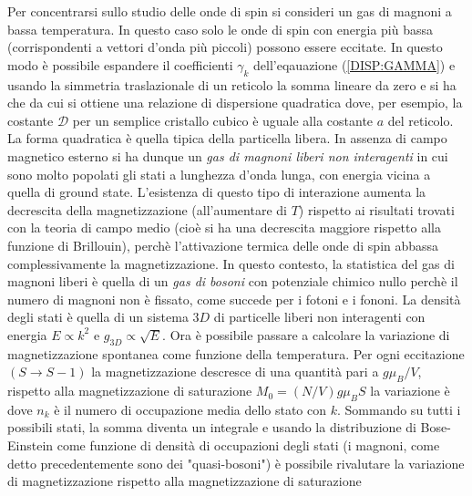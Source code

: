 Per concentrarsi sullo studio delle onde di spin si consideri un gas di magnoni a bassa temperatura. In questo caso solo le onde di spin con energia pi\`u bassa (corrispondenti a vettori d'onda pi\`u piccoli) possono essere eccitate. In questo modo \`e possibile espandere il coefficienti $\gamma_k$ dell'eqauazione (\ref{DISP:GAMMA}) e usando la simmetria traslazionale di un reticolo la somma lineare da zero e si ha che
da cui si ottiene una relazione di dispersione quadratica
dove, per esempio, la costante $\mathcal{D}$ per un semplice cristallo cubico \`e uguale alla costante $a$ del reticolo. La forma quadratica \`e quella tipica della particella libera. In assenza di campo magnetico esterno si ha dunque un \textit{gas di magnoni liberi non interagenti} in cui sono molto popolati gli stati a lunghezza d'onda lunga, con energia vicina a quella di ground state. L'esistenza di questo tipo di interazione aumenta la decrescita della magnetizzazione (all'aumentare di $T$) rispetto ai risultati trovati con la teoria di campo medio (cio\`e si ha una decrescita maggiore rispetto alla funzione di Brillouin), perch\`e l'attivazione termica delle onde di spin abbassa complessivamente la magnetizzazione. 
In questo contesto, la statistica del gas di magnoni liberi \`e quella di un \textit{gas di bosoni} con potenziale chimico nullo perch\`e il numero di magnoni non \`e fissato, come succede per i fotoni e i fononi. La densit\`a degli stati \`e quella di un sistema $3D$ di particelle liberi non interagenti con energia $E\propto k^2$ e $g_{3D} \propto \sqrt{E}$. Ora \`e possibile passare a calcolare la variazione di magnetizzazione spontanea come funzione della temperatura. Per ogni eccitazione $(S\to S-1)$ la magnetizzazione descresce di una quantit\`a pari a $g\mu_B/V$, rispetto alla magnetizzazione di saturazione $M_0= (N/V)g\mu_B S$ la variazione \`e 
dove $n_k$ \`e il numero di occupazione media dello stato con $k$. Sommando su tutti i possibili stati, la somma diventa un integrale e usando la distribuzione di Bose-Einstein come funzione di densit\`a di occupazioni degli stati (i magnoni, come detto precedentemente sono dei "quasi-bosoni") \`e possibile rivalutare la variazione di magnetizzazione rispetto alla magnetizzazione di saturazione
